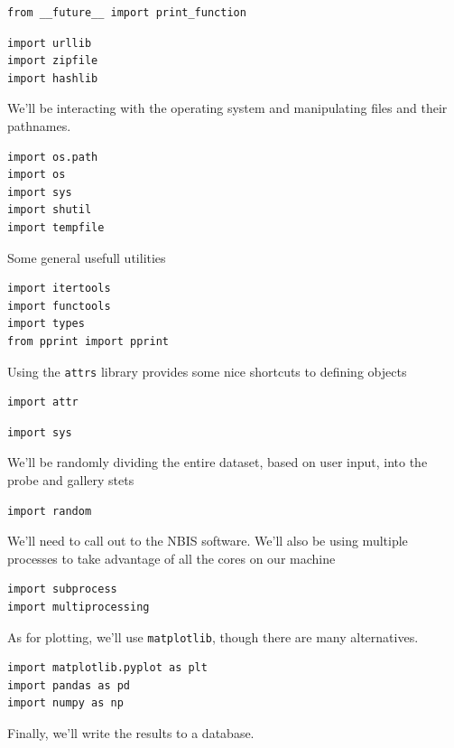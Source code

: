 \begin{verbatim}
from __future__ import print_function
\end{verbatim}

\begin{verbatim}
import urllib
import zipfile
import hashlib
\end{verbatim}

We'll be interacting with the operating system and manipulating files
and their pathnames.

\begin{verbatim}
import os.path
import os
import sys
import shutil
import tempfile
\end{verbatim}

Some general usefull utilities

\begin{verbatim}
import itertools
import functools
import types
from pprint import pprint
\end{verbatim}

Using the \texttt{attrs} library provides some nice shortcuts to
defining objects

\begin{verbatim}
import attr
\end{verbatim}

\begin{verbatim}
import sys
\end{verbatim}

We'll be randomly dividing the entire dataset, based on user input, into
the probe and gallery stets

\begin{verbatim}
import random
\end{verbatim}

We'll need to call out to the NBIS software. We'll also be using
multiple processes to take advantage of all the cores on our machine

\begin{verbatim}
import subprocess
import multiprocessing
\end{verbatim}

As for plotting, we'll use \texttt{matplotlib}, though there are many
alternatives.

\begin{verbatim}
import matplotlib.pyplot as plt
import pandas as pd
import numpy as np
\end{verbatim}

Finally, we'll write the results to a database.

